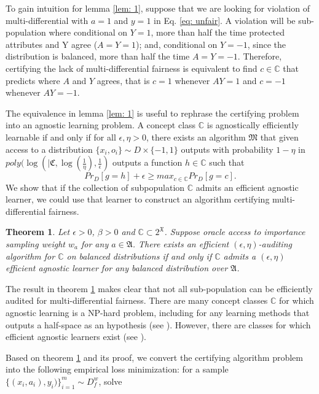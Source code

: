 \documentclass{article}
\newtheorem{thm}{Theorem}[section]
\begin{document}
To gain intuition for lemma \ref{lem: 1}, suppose that we are looking for violation of multi-differential with $a=1$ and $y=1$ in Eq. \eqref{eq: unfair}. A violation will be sub-population where conditional on $Y=1$,  more than half the time protected attributes and Y agree ($A=Y=1$); and, conditional on $Y=-1$, since the distribution is balanced, more than half the time $A=Y=-1$. Therefore, certifying the lack of multi-differential fairness is equivalent to find $c\in \mathbb{C}$ that predicts where $A$ and $Y$ agrees, that is $c=1$ whenever $AY=1$ and $c=-1$ whenever $AY=-1$. 

\bigskip
The equivalence in lemma \ref{lem: 1} is useful to rephrase the certifying problem into an agnostic learning problem. A concept class $\mathbb{C}$ is agnostically efficiently learnable if and only if for all $\epsilon, \eta >0$, there exists an algorithm $\mathfrak{M}$ that given access to a distribution $\{x_{i}, o_{i}\}\sim D\times \{-1, 1\}$ outputs with probability $1-\eta$ in $poly(\log(|\mathfrak{C}, \log(\frac{1}{\eta}), \frac{1}{\epsilon})$ outputs  a function $h\in \mathbb{C}$ such that
$$ Pr_{D}[g=h]  + \epsilon \geq max_{c\in \mathbb{C}}Pr_{D}[g=c]. $$
We show that if the collection of subpopulation $\mathbb{C}$ admits an efficient agnostic learner, we could use that learner to construct an algorithm certifying multi-differential fairness.

\begin{thm}
\label{thm: al}
Let $\epsilon > 0$, $\beta >0$ and $\mathbb{C}\subset 2^{\mathfrak{X}}$. Suppose oracle access to importance sampling weight $w_{a}$ for any $a\in \mathfrak{A}$. There exists an efficient $(\epsilon, \eta)$-auditing algorithm for $\mathbb{C}$ on balanced distributions if and only if $\mathbb{C}$ admits a $( \epsilon,\eta)$ efficient agnostic learner for any balanced distribution over $\mathfrak{A}$.  
\end{thm}

The result in theorem \ref{thm: al} makes clear that not all sub-population can be efficiently audited for multi-differential fairness. There are many concept classes $\mathbb{C}$ for which agnostic learning is a NP-hard problem, including for any learning methods that outputs a half-space as an hypothesis (see \cite{feldman2012agnostic}). However, there are classes for which efficient agnostic learners exist (see \cite{kearns1994toward}).

\bigskip
Based on theorem \ref{thm: al} and its proof,  we convert the certifying algorithm problem into the following empirical loss minimization: for a sample $\{(x_{i}, a_{i}), y_{i})\}_{i=1}^{m}\sim D^{w}_{f}$, solve
\end{document}
